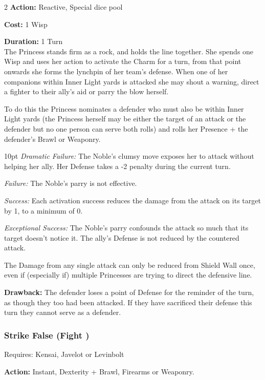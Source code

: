 \begin{multicols}{2}
\noindent \textbf{Action:} Reactive, Special dice pool

\noindent \textbf{Cost:} 1 Wisp

\noindent \textbf{Duration:} 1 Turn\\

\noindent The Princess stands firm as a rock, and holds the line together. She spends one Wisp and uses her action to activate the Charm for a turn, from that point onwards she forms the lynchpin of her team's defense. When one of her companions within Inner Light yards is attacked she may shout a warning, direct a fighter to their ally's aid or parry the blow herself. 

To do this the Princess nominates a defender who must also be within Inner Light yards (the Princess herself may be either the target of an attack or the defender but no one person can serve both rolls) and rolls her Presence + the defender's Brawl or Weaponry. 

\begin{myindentpar}{10pt} 
\emph{Dramatic Failure:}  The Noble’s clumsy move exposes her to attack without helping her ally. Her Defense takes a -2 penalty during the current turn.

\emph{Failure:} The Noble’s parry is not effective.

\emph{Success:} Each activation success reduces the damage from the attack on its target by 1, to a minimum of 0.

\emph{Exceptional Success:} The Noble’s parry confounds the attack so much that its target doesn’t notice it. The ally’s Defense is not reduced by the countered attack.\end{myindentpar}

The Damage from any single attack can only be reduced from Shield Wall once, even if (especially if) multiple Princesses are trying to direct the defensive line.

\noindent \textbf{Drawback:} The defender loses a point of Defense for the reminder of the turn, as though they too had been attacked. If they have sacrificed their defense this turn they cannot serve as a defender. 

\subsubsection*{Strike False (Fight \textbullet\textbullet)}

\noindent Requires: Kensai, Javelot or Levinbolt

\noindent \textbf{Action:} Instant, Dexterity + Brawl, Firearms or Weaponry.


\end{multicols}
